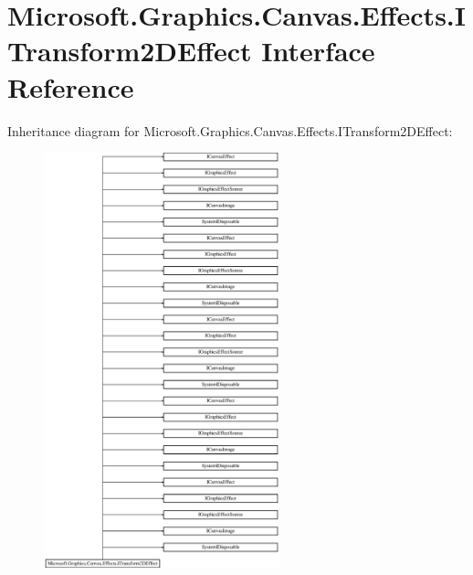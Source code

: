 \hypertarget{interface_microsoft_1_1_graphics_1_1_canvas_1_1_effects_1_1_i_transform2_d_effect}{}\section{Microsoft.\+Graphics.\+Canvas.\+Effects.\+I\+Transform2\+D\+Effect Interface Reference}
\label{interface_microsoft_1_1_graphics_1_1_canvas_1_1_effects_1_1_i_transform2_d_effect}
Inheritance diagram for Microsoft.\+Graphics.\+Canvas.\+Effects.\+I\+Transform2\+D\+Effect\+:\begin{figure}[H]
\begin{center}
\leavevmode
\includegraphics[height=12.000000cm]{interface_microsoft_1_1_graphics_1_1_canvas_1_1_effects_1_1_i_transform2_d_effect}
\end{center}
\end{figure}

